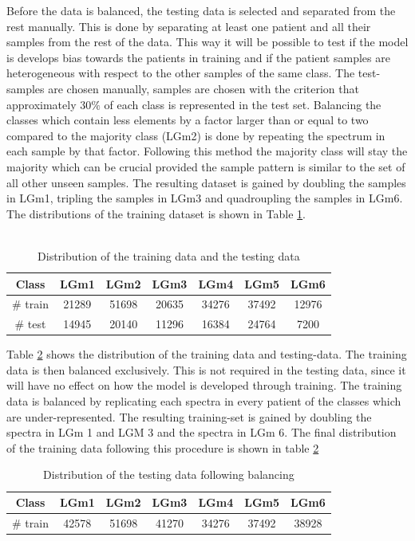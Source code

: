 Before the data is balanced, the testing data is selected and separated from the rest manually. This is done by separating at least one patient and all their samples from the rest of the data. This way it will be possible to test if the model is develops bias towards the patients in training and if the patient samples are heterogeneous with respect to the other samples of the same class. The test-samples are chosen manually, samples are chosen with the criterion that approximately $30\%$ of each class is represented in the test set. Balancing the classes which contain less elements by a factor larger than or equal to two compared to the majority class (LGm2) is done by repeating the spectrum in each sample by that factor. Following this method the majority class will stay the majority which can be crucial provided the sample pattern is similar to the set of all other unseen samples. The resulting dataset is gained by doubling the samples in LGm1, tripling the samples in LGm3 and quadroupling the samples in LGm6. The distributions of the training dataset is shown in Table \ref{table:2}.
\\
\\
\begin{table}[htb]
\centering
 \begin{tabular}{||c c c c c c c||} 
 \hline
 Class & LGm1 & LGm2 & LGm3 & LGm4 & LGm5 & LGm6 \\ [0.5ex] 
 \hline\hline
 \# train & 21289	& 51698	& 20635	& 34276	& 37492	& 12976 \\
 \hline 
 \# test & 14945 & 20140 & 11296 & 16384 & 24764 & 7200 \\
 \hline

\end{tabular}
\caption{Distribution of the training data and the testing data}
\label{table:2}
\end{table}

Table \ref{table:3} shows the distribution of the training data and testing-data. The training data is then balanced exclusively. This is not required in the testing data, since it will have no effect on how the model is developed through training. The training data is balanced by replicating each spectra in every patient of the classes which are under-represented. The resulting training-set is gained by doubling the spectra in LGm 1 and LGM 3 and  the spectra in LGm 6. The final distribution of the training data following this procedure is shown in table \ref{table:3}

\begin{table}[htb]
\centering
 \begin{tabular}{||c c c c c c c||} 
 \hline
 Class & LGm1 & LGm2 & LGm3 & LGm4 & LGm5 & LGm6 \\ [0.5ex] 
 \hline\hline
 \# train & 42578 & 51698 & 41270 & 34276 & 37492 & 38928 \\
 \hline 

\end{tabular}
\caption{Distribution of the testing data following balancing}
\label{table:3}
\end{table}

